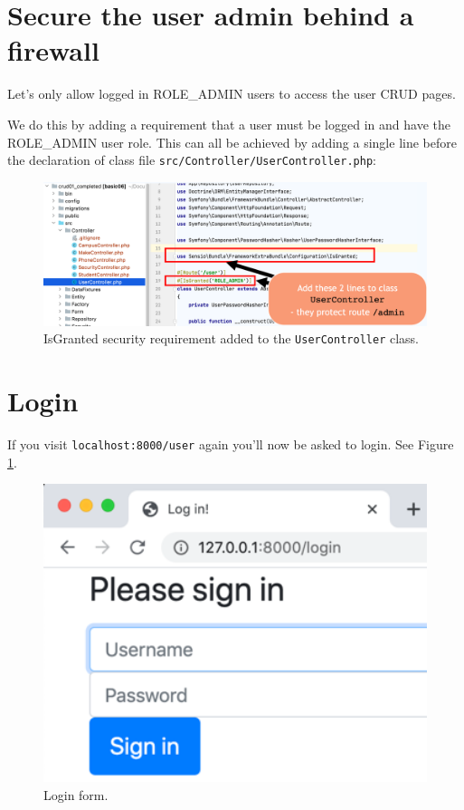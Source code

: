 \documentclass[a4paperpaper,openright]{book}
\begin{document}
\hypertarget{secure-the-user-admin-behind-a-firewall}{%
\section{Secure the user admin behind a
firewall}\label{secure-the-user-admin-behind-a-firewall}}

Let's only allow logged in ROLE\_ADMIN users to access the user CRUD
pages.

We do this by adding a requirement that a user must be logged in and
have the ROLE\_ADMIN user role. This can all be achieved by adding a
single line before the declaration of class file
\texttt{src/Controller/UserController.php}:

\begin{figure}
\centering
\includegraphics[width=1\textwidth,height=\textheight]{./tex2pdf.-1b59354caa481da0/a63c83bb6c49061438fa7796f13ea49e4657cae5.png}
\caption{IsGranted security requirement added to the
\texttt{UserController} class.}
\end{figure}

\hypertarget{login}{%
\section{Login}\label{login}}

If you visit \texttt{localhost:8000/user} again you'll now be asked to
login. See Figure \ref{login}.

\begin{figure}
\centering
\includegraphics[width=1\textwidth,height=\textheight]{./tex2pdf.-1b59354caa481da0/dfbc39d266ca1d8b1fbd80ce0fe76702d4fb92f1.png}
\caption{Login form. \label{login}}
\end{figure}
\end{document}

